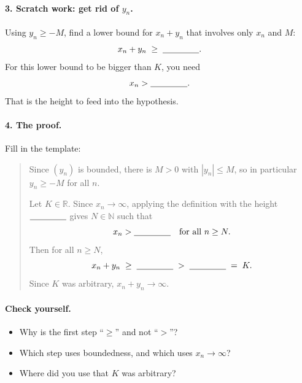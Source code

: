 \documentclass[11pt]{article}
\newcommand{\blank}{\underline{\hspace{1.5cm}}}
\begin{document}
\paragraph{3. Scratch work: get rid of $y_n$.}
Using $y_n\ge -M$, find a lower bound for $x_n+y_n$ that involves only
$x_n$ and $M$:
\[
  x_n + y_n \;\ge\; \blank .
\]
For this lower bound to be bigger than $K$, you need
\[
  x_n > \blank .
\]
That is the height to feed into the hypothesis.

\vspace{1cm}

\paragraph{4. The proof.} Fill in the template:
\begin{quote}
Since $(y_n)$ is bounded, there is $M>0$ with $|y_n|\le M$, so in
particular $y_n\ge -M$ for all $n$.

Let $K\in\mathbb{R}$. Since $x_n\to\infty$, applying the definition with
the height $\blank$ gives $N\in\mathbb{N}$ such that
\[
  x_n > \blank \quad\text{for all } n\ge N .
\]
Then for all $n\ge N$,
\[
  x_n + y_n \;\ge\; \blank \;>\; \blank \;=\; K .
\]
Since $K$ was arbitrary, $x_n+y_n\to\infty$.
\end{quote}

\paragraph{Check yourself.}
\begin{itemize}
  \item Why is the first step ``$\ge$'' and not ``$>$''?
  \item Which step uses boundedness, and which uses $x_n\to\infty$?
  \item Where did you use that $K$ was arbitrary?
\end{itemize}
\end{document}
